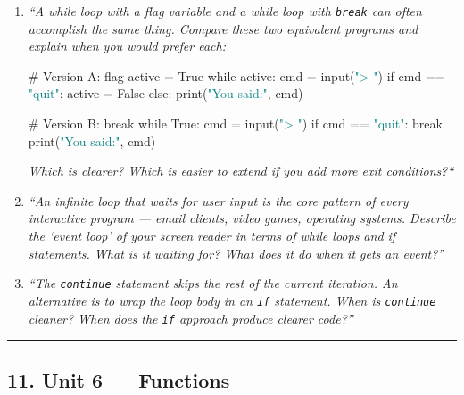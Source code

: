 \documentclass[
  justified,
  openright,
]{tufte-book}
\newcommand{\BuiltInTok}[1]{#1}
\newcommand{\CommentTok}[1]{\textcolor{MidGray}{#1}}
\newcommand{\ControlFlowTok}[1]{\textcolor{BrandBlue}{#1}}
\newcommand{\NormalTok}[1]{#1}
\newcommand{\OperatorTok}[1]{\textcolor{DarkGray}{#1}}
\newcommand{\StringTok}[1]{\textcolor{Teal}{#1}}
\newcommand{\VariableTok}[1]{#1}
\newenvironment{Shaded}{%
  \begin{snugshade}
}{%
  \end{snugshade}
}
\begin{document}
\begin{enumerate}
\def\labelenumi{\arabic{enumi}.}
\item
  \emph{``A while loop with a flag variable and a while loop with
  \texttt{break} can often accomplish the same thing. Compare these two
  equivalent programs and explain when you would prefer each:}

\begin{Shaded}
\begin{Highlighting}[]
\CommentTok{\# Version A: flag}
\NormalTok{active }\OperatorTok{=} \VariableTok{True}
\ControlFlowTok{while}\NormalTok{ active:}
\NormalTok{    cmd }\OperatorTok{=} \BuiltInTok{input}\NormalTok{(}\StringTok{"\textgreater{} "}\NormalTok{)}
    \ControlFlowTok{if}\NormalTok{ cmd }\OperatorTok{==} \StringTok{"quit"}\NormalTok{: active }\OperatorTok{=} \VariableTok{False}
    \ControlFlowTok{else}\NormalTok{: }\BuiltInTok{print}\NormalTok{(}\StringTok{"You said:"}\NormalTok{, cmd)}

\CommentTok{\# Version B: break}
\ControlFlowTok{while} \VariableTok{True}\NormalTok{:}
\NormalTok{    cmd }\OperatorTok{=} \BuiltInTok{input}\NormalTok{(}\StringTok{"\textgreater{} "}\NormalTok{)}
    \ControlFlowTok{if}\NormalTok{ cmd }\OperatorTok{==} \StringTok{"quit"}\NormalTok{: }\ControlFlowTok{break}
    \BuiltInTok{print}\NormalTok{(}\StringTok{"You said:"}\NormalTok{, cmd)}
\end{Highlighting}
\end{Shaded}

  \emph{Which is clearer? Which is easier to extend if you add more exit
  conditions?{\kern0pt}``}
\item
  \emph{``An infinite loop that waits for user input is the core pattern
  of every interactive program --- email clients, video games, operating
  systems. Describe the `event loop' of your screen reader in terms of
  while loops and if statements. What is it waiting for? What does it do
  when it gets an event?''}
\item
  \emph{``The \texttt{continue} statement skips the rest of the current
  iteration. An alternative is to wrap the loop body in an \texttt{if}
  statement. When is \texttt{continue} cleaner? When does the
  \texttt{if} approach produce clearer code?''}
\end{enumerate}

\begin{center}\rule{0.5\linewidth}{0.5pt}\end{center}

\subsection{11. Unit 6 --- Functions}\label{unit-6-functions}
\end{document}
